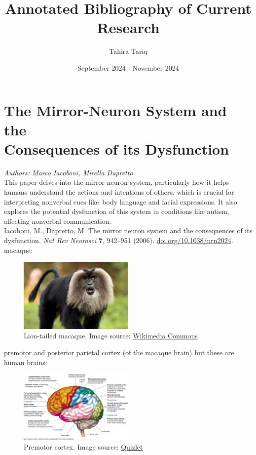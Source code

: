\documentclass[12pt]{article}
\title{Annotated Bibliography of Current Research}
\author{Tahira Tariq}
\date{September 2024 - November 2024}
\begin{document}
\maketitle

\section{The Mirror-Neuron System and the\\Consequences of its Dysfunction}
\textit{Authors: Marco Iacoboni, Mirella Dapretto}\\
This paper delves into the mirror neuron system, particularly how it helps humans understand the actions and intentions of others, which is crucial for interpreting nonverbal cues like body language and facial expressions. It also explores the potential dysfunction of this system in conditions like autism, affecting nonverbal communication.\\


\noindent Iacoboni, M., Dapretto, M. The mirror neuron system and the consequences of its dysfunction. \textit{Nat Rev Neurosci} \textbf{7}, 942–951 (2006). \href{https://doi.org/10.1038/nrn2024}{doi.org/10.1038/nrn2024}.\\

\noindent macaque:\\
\begin{figure}[h]
    \centering
    \includegraphics[width=0.5\textwidth]{macaque.jpg} %
    \caption{Lion-tailed macaque. Image source: \href{https://commons.wikimedia.org/wiki/File:Lion-tailed_macaque_by_N_A_Nazeer.jpg}{Wikimedia Commons}}
    \label{fig:macaque}
\end{figure}

\noindent premotor and posterior parietal cortex (of the macaque brain) but these are human brains:\\
\begin{figure}[h]
    \centering
    \includegraphics[width=0.5\textwidth]{brain1.png} %
    \caption{Premotor cortex. Image source: \href{https://o.quizlet.com/il-zAgEMk31L--6ugy5MGw_b.png}{Quizlet}}
    \label{fig:pre}
\end{figure}
\end{document}
